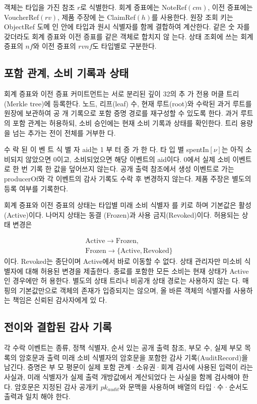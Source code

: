 객체는 타입을 가진 참조 \(r\)로 식별한다. 회계 증표에는
NoteRef\((cm)\), 이전 증표에는 VoucherRef\((rv)\), 제품 주장에
는 ClaimRef\((h)\)를 사용한다. 원장 조회 키는 ObjectRef 도메
인 안에 타입과 원시 식별자를 함께 결합하여 계산한다. 같은 숫
자를 갖더라도 회계 증표와 이전 증표를 같은 객체로 합치지 않
는다. 상태 조회에 쓰는 회계 증표의 \(nf\)와 이전 증표의 \(rvnf\)도
타입별로 구분한다.

\subsection{포함 관계, 소비 기록과 상태}
회계 증표와 이전 증표 커미트먼트는 서로 분리된 깊이 32의 추
가 전용 머클 트리(Merkle tree)에 등록한다. 노드, 리프(leaf)
수, 현재 루트(root)와 수락된 과거 루트를 원장에 보관하여 공
개 기록으로 포함 증명 경로를 재구성할 수 있도록 한다. 과거
루트의 포함 관계는 허용하되, 소비 승인에는 현재 소비 기록과
상태를 확인한다. 트리 용량을 넘는 추가는 전이 전체를 거부한
다.

수 락 된 이 벤 트 식 별 자 aid는 1 부 터 증 가 한 다. 타 입 별
spentIn\([ν]\)는 아직 소비되지 않았으면 0이고, 소비되었으면
해당 이벤트의 aid이다. 0에서 실제 소비 이벤트로 한 번 기록
한 값을 덮어쓰지 않는다. 공개 출력 참조에서 생성 이벤트로
가는 producerOf와 각 이벤트의 감사 기록도 수락 후 변경하지
않는다. 제품 주장은 별도의 등록 여부를 기록한다.

회계 증표와 이전 증표의 상태는 타입별 미래 소비 식별자
를 키로 하며 기본값은 활성(Active)이다. 나머지 상태는 동결
(Frozen)과 사용 금지(Revoked)이다. 허용되는 상태 변경은

\begin{equation}
    \begin{gathered}\mathrm{Active}\longrightarrow\mathrm{Frozen},\\\mathrm{Frozen}\longrightarrow\{\mathrm{Active},\mathrm{Revoked}\}\end{gathered}\tag{10}
\end{equation}
이다. Revoked는 종단이며 Active에서 바로 이동할 수 없다.
상태 관리자만 미소비 식별자에 대해 허용된 변경을 제출한다.
종료를 포함한 모든 소비는 현재 상태가 Active인 경우에만 허
용한다. 별도의 상태 트리나 비공개 상태 경로는 사용하지 않는
다. 매핑의 기본값만으로 객체의 존재가 입증되지는 않으며, 올
바른 객체의 식별자를 사용하는 책임은 신뢰된 감사자에게 있
다.

\subsection{전이와 결합된 감사 기록}
각 수락 이벤트는 종류, 정책 식별자, 순서 있는 공개 출력 참조,
부모 수, 실제 부모 목록의 암호문과 출력 미래 소비 식별자의
암호문을 포함한 감사 기록(AuditRecord)을 남긴다. 증명은 부
모 평문이 실제 포함 관계·소유권·회계 검사에 사용된 입력이
라는 사실과, 미래 식별자가 실제 출력 개방값에서 계산되었다
는 사실을 함께 검사해야 한다. 암호문은 지정된 감사 공개키
\(pk_{audit}\)와 문맥을 사용하며 배열의 타입·수·순서도 출력과 일치
해야 한다.

